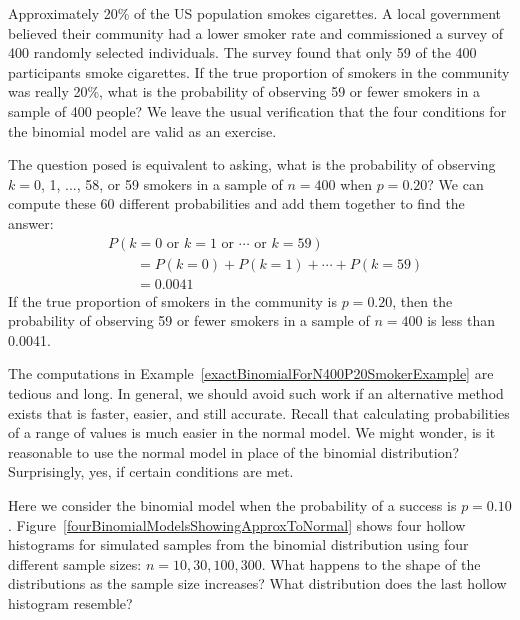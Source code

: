 \begin{examplewrap}
\begin{nexample}{Approximately 20\% of the US population smokes cigarettes. A local government believed their community had a lower smoker rate and commissioned a survey of 400 randomly selected individuals. The survey found that only 59 of the 400 participants smoke cigarettes. If the true proportion of smokers in the community was really 20\%, what is the probability of observing 59 or fewer smokers in a sample of 400 people?}\label{exactBinomialForN400P20SmokerExample}
We leave the usual verification that the four conditions for the binomial model are valid as an exercise.

The question posed is equivalent to asking, what is the probability of observing $k=0$, 1, ..., 58, or 59 smokers in a sample of $n=400$ when $p=0.20$? We can compute these 60 different probabilities and add them together to find the answer:
\begin{align*}
&P(k=0\text{ or }k=1\text{ or }\cdots\text{ or } k=59) \\
	&\qquad= P(k=0) + P(k=1) + \cdots + P(k=59) \\
	&\qquad=0.0041
\end{align*}
If the true proportion of smokers in the community is $p=0.20$, then the probability of observing 59 or fewer smokers in a sample of $n=400$ is less than 0.0041.
\end{nexample}
\end{examplewrap}

The computations in Example~\ref{exactBinomialForN400P20SmokerExample} are tedious and long. In general, we should avoid such work if an alternative method exists that is faster, easier, and still accurate. Recall that calculating probabilities of a range of values is much easier in the normal model. We might wonder, is it reasonable to use the normal model in place of the binomial distribution? Surprisingly, yes, if certain conditions are met.

\begin{exercisewrap}
\begin{nexercise}
Here we consider the binomial model when the probability of a success is $p=0.10$. Figure~\ref{fourBinomialModelsShowingApproxToNormal} shows four hollow histograms for simulated samples from the binomial distribution using four different sample sizes: $n=10, 30, 100, 300$. What happens to the shape of the distributions as the sample size increases? What distribution does the last hollow histogram resemble?\footnotemark
\end{nexercise}
\end{exercisewrap}

